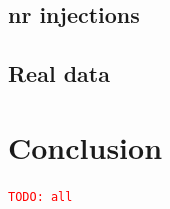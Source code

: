 \documentclass[prd,amssymb,amsmath,amsfonts,nofootinbib,reprint,showpacs,longbibliography]{revtex4-1}
\newcommand{\todo}[1]{\textcolor{red}{\texttt{TODO: #1}}}
\begin{document}
\subsection{\ac{nr} injections}

\subsection{Real data}

\section{Conclusion}
\todo{all}


\end{document}
